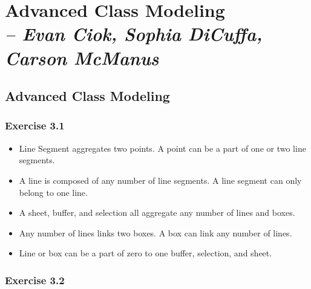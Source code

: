 \chapter{Advanced Class Modeling \\
  \small{\textit{-- Evan Ciok, Sophia DiCuffa, Carson McManus}}
  \label{Chapter::LabTwo}}

\section{Advanced Class Modeling \label{Section::LabTwo}}

\subsection{Exercise 3.1}

\begin{itemize}
  \item Line Segment aggregates two points. A point can be a part of one or two line segments.
  \item A line is composed of any number of line segments. A line segment can only belong to one line.
  \item A sheet, buffer, and selection all aggregate any number of lines and boxes.
  \item Any number of lines links two boxes. A box can link any number of lines.
  \item Line or box can be a part of zero to one buffer, selection, and sheet.
\end{itemize}

\subsection{Exercise 3.2}

